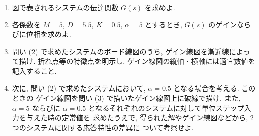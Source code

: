 \begin{enumerate}[label=(\arabic*)]
  \item 図で表されるシステムの伝達関数 $G(s)$ を求めよ.

  \item 各係数を $M=5$, $D=5.5$, $K=0.5$, $\alpha=5$ とするとき,
        $G(s)$ のゲインならびに位相を求めよ.

  \item 問い (2) で求めたシステムのボード線図のうち, ゲイン線図を漸近線によって描け.
        折れ点等の特徴点を明示し, ゲイン線図の縦軸・横軸には適宜数値を記入すること.

  \item 次に, 問い (2) で求めたシステムにおいて, $\alpha=0.5$ となる場合を考える. このときの
        ゲイン線図を問い (3) で描いたゲイン線図上に破線で描け. また, $\alpha=5$ ならびに
        $\alpha=0.5$ となるそれぞれのシステムに対して単位ステップ入力を与えた時の定常値を
        求めたうえで, 得られた解やゲイン線図などから, 2 つのシステムに関する応答特性の差異に
        ついて考察せよ.
\end{enumerate}
